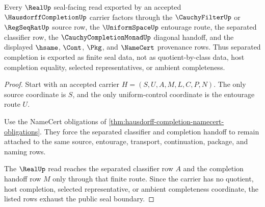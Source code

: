 \begin{theorem}
\label{thm:hausdorff-completion-separated-seal-boundary}
Every $\RealUp$ seal-facing read exported by an accepted $\HausdorffCompletionUp$ carrier factors through the $\CauchyFilterUp$ or $\RegSeqRatUp$ source row, the $\UniformSpaceUp$ entourage route, the separated classifier row, the $\CauchyCompletionMonadUp$ diagonal handoff, and the displayed $\hsame$, $\Cont$, $\Pkg$, and $\NameCert$ provenance rows. Thus separated completion is exported as finite seal data, not as quotient-by-class data, host completion equality, selected representatives, or ambient completeness.
\end{theorem}
\begin{proof}
Start with an accepted carrier $H=(S,U,A,M,L,C,P,N)$. The only source coordinate is $S$, and the only uniform-control coordinate is the entourage route $U$.

Use the NameCert obligations of \autoref{thm:hausdorff-completion-namecert-obligations}. They force the separated classifier and completion handoff to remain attached to the same source, entourage, transport, continuation, package, and naming rows.

The $\RealUp$ read reaches the separated classifier row $A$ and the completion handoff row $M$ only through that finite route. Since the carrier has no quotient, host completion, selected representative, or ambient completeness coordinate, the listed rows exhaust the public seal boundary.
\end{proof}

